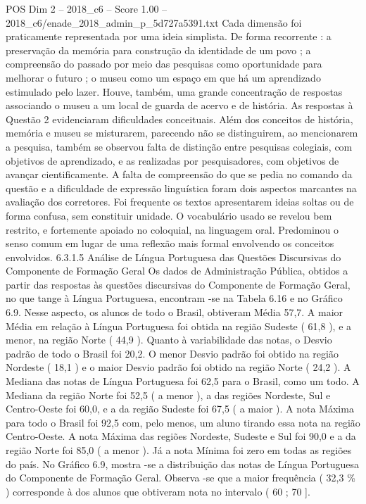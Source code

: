 \begin{textsample}{POS Dim 2 – 2018\_c6 – Score 1.00 – 2018\_c6/enade\_2018\_admin\_p\_5d727a5391.txt}
Cada dimensão foi praticamente representada por uma ideia simplista.
De forma recorrente : a preservação da memória para construção da identidade de um povo ; a compreensão do passado por meio das pesquisas como oportunidade para melhorar o futuro ; o museu como um espaço em que há um aprendizado estimulado pelo lazer.
Houve, também, uma grande concentração de respostas associando o museu a um local de guarda de acervo e de história.
As respostas à Questão 2 evidenciaram dificuldades conceituais.
Além dos conceitos de história, memória e museu se misturarem, parecendo não se distinguirem, ao mencionarem a pesquisa, também se observou falta de distinção entre pesquisas colegiais, com objetivos de aprendizado, e as realizadas por pesquisadores, com objetivos de avançar cientificamente.
A falta de compreensão do que se pedia no comando da questão e a dificuldade de expressão linguística foram dois aspectos marcantes na avaliação dos corretores.
Foi frequente os textos apresentarem ideias soltas ou de forma confusa, sem constituir unidade.
O vocabulário usado se revelou bem restrito, e fortemente apoiado no coloquial, na linguagem oral.
Predominou o senso comum em lugar de uma reflexão mais formal envolvendo os conceitos envolvidos. 6.3.1.5 Análise de Língua Portuguesa das Questões Discursivas do Componente de Formação Geral Os dados de Administração Pública, obtidos a partir das respostas às questões discursivas do Componente de Formação Geral, no que tange à Língua Portuguesa, encontram -se na Tabela 6.16 e no Gráfico 6.9.
Nesse aspecto, os alunos de todo o Brasil, obtiveram Média 57,7.
A maior Média em relação à Língua Portuguesa foi obtida na região Sudeste ( 61,8 ), e a menor, na região Norte ( 44,9 ).
Quanto à variabilidade das notas, o Desvio padrão de todo o Brasil foi 20,2.
O menor Desvio padrão foi obtido na região Nordeste ( 18,1 ) e o maior Desvio padrão foi obtido na região Norte ( 24,2 ).
A Mediana das notas de Língua Portuguesa foi 62,5 para o Brasil, como um todo.
A Mediana da região Norte foi 52,5 ( a menor ), a das regiões Nordeste, Sul e Centro-Oeste foi 60,0, e a da região Sudeste foi 67,5 ( a maior ).
A nota Máxima para todo o Brasil foi 92,5 com, pelo menos, um aluno tirando essa nota na região Centro-Oeste.
A nota Máxima das regiões Nordeste, Sudeste e Sul foi 90,0 e a da região Norte foi 85,0 ( a menor ).
Já a nota Mínima foi zero em todas as regiões do país.
No Gráfico 6.9, mostra -se a distribuição das notas de Língua Portuguesa do Componente de Formação Geral.
Observa -se que a maior frequência ( 32,3 \% ) corresponde à dos alunos que obtiveram nota no intervalo ( 60 ; 70 ].

\end{textsample}
